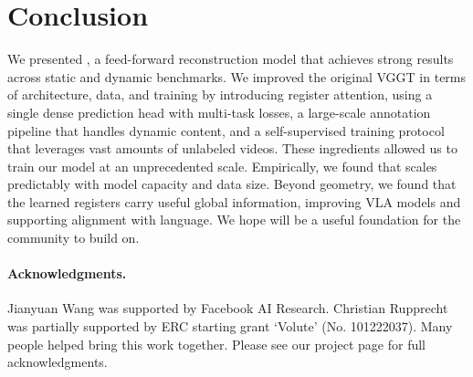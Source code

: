\section{Conclusion}%
\label{sec:conclusion}

We presented \method, a feed-forward reconstruction model that achieves strong results across static and dynamic benchmarks.
We improved the original VGGT in terms of architecture, data, and training by introducing register attention, using a single dense prediction head with multi-task losses, a large-scale annotation pipeline that handles dynamic content, and a self-supervised training protocol that leverages vast amounts of unlabeled videos.
These ingredients allowed us to train our model at an unprecedented scale.
Empirically, we found that \method scales predictably with model capacity and data size.
Beyond geometry, we found that the learned registers carry useful global information, improving VLA models and supporting alignment with language.
We hope \method will be a useful foundation for the community to build on.

\paragraph{Acknowledgments.}
Jianyuan Wang was supported by Facebook AI Research. 
Christian Rupprecht was partially supported by ERC starting grant `Volute' (No. 101222037).
Many people helped bring this work together. 
Please see our project page for full acknowledgments.

